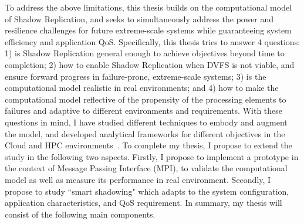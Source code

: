 
To address the above limitations, this thesis builds on the computational model of Shadow Replication, and seeks to simultaneously address the power and resilience challenges for future extreme-scale systems while guaranteeing system efficiency and application QoS.
Specifically, this thesis tries to answer 4 questions: 1) is Shadow Replication general enough to achieve objectives beyond time to completion; %
2) how to enable Shadow Replication when DVFS is not viable, and ensure forward progress in failure-prone, extreme-scale systems; 3) is the computational model realistic in real environments; and 4) how to make the computational model reflective of the propensity of the processing elements to failures and adaptive to different environments and requirements.
With these questions in mind, 
I have studied different techniques to embody and augment the model, and developed analytical frameworks for different objectives in the Cloud and HPC environments~\cite{cui_2014_closer,cui_en7085151,cui_2016_scalcom}.
To complete my thesis, I propose to extend the study in the following two aspects.
Firstly, I propose to implement a prototype in the context of Message Passing Interface (MPI), to validate the 
computational model as well as measure its performance in real environment. Secondly, I propose to study  
``smart shadowing" which adapts to the system configuration, application characteristics, and QoS requirement.
In summary, my thesis will consist of the following main components.

